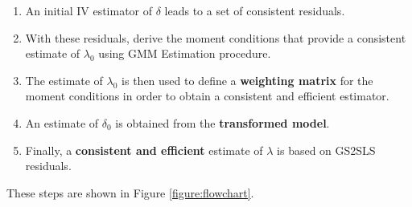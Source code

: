 \documentclass[english,12pt]{book}\usepackage[]{graphicx}\usepackage[]{xcolor}
\begin{document}
\begin{enumerate}
  \item An initial IV estimator of $\delta$ leads to a set of consistent residuals.
  \item With these residuals, derive the moment conditions that provide a consistent estimate  of $\lambda_0$ using GMM Estimation procedure.
  \item The estimate of $\lambda_0$ is then used to define a \textbf{weighting matrix} for the moment conditions in order to obtain a consistent and efficient estimator. 
  \item An estimate of $\delta_0$ is obtained from the \textbf{transformed model}.
  \item Finally, a \textbf{consistent and efficient} estimate of $\lambda$ is based on GS2SLS residuals. 
\end{enumerate}

These steps are shown in Figure \ref{figure:flowchart}.
\end{document}
